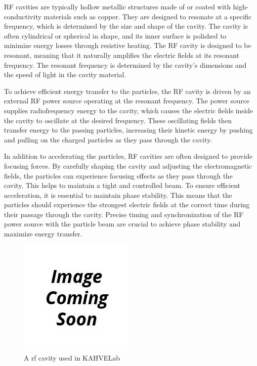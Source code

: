 \documentclass[a4paper,oneside,12pt]{report}
\numberwithin{equation}{chapter}
\begin{document}
RF cavities are typically hollow metallic structures made of or coated with high-conductivity materials such as copper. 
They are designed to resonate at a specific frequency, which is determined by the size and shape of the cavity. 
The cavity is often cylindrical or spherical in shape, and its inner surface is polished to minimize energy losses through resistive heating.
The RF cavity is designed to be resonant, meaning that it naturally amplifies the electric fields at its resonant frequency. 
The resonant frequency is determined by the cavity's dimensions and the speed of light in the cavity material.

To achieve efficient energy transfer to the particles, the RF cavity is driven by an external RF power source operating at the resonant frequency. 
The power source supplies radiofrequency energy to the cavity, which causes the electric fields inside the cavity to oscillate at the desired frequency. 
These oscillating fields then transfer energy to the passing particles, increasing their kinetic energy by pushing and pulling on the charged particles as they pass through the cavity. 

In addition to accelerating the particles, RF cavities are often designed to provide focusing forces. 
By carefully shaping the cavity and adjusting the electromagnetic fields, the particles can experience focusing effects as they pass through the cavity. 
This helps to maintain a tight and controlled beam. To ensure efficient acceleration, it is essential to maintain phase stability. 
This means that the particles should experience the strongest electric fields at the correct time during their passage through the cavity. 
Precise timing and synchronization of the RF power source with the particle beam are crucial to achieve phase stability and maximize energy transfer.
\begin{figure}[H]
    \centering
    \includegraphics[scale=0.75]{./figures/to_be_added.png}
    \caption{A rf cavity used in KAHVELab}
\end{figure}
\end{document}
